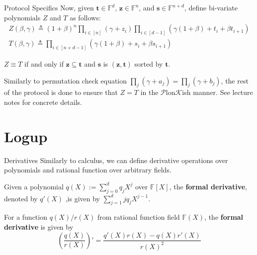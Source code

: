 \documentclass{zkdl-presentation-template}
\begin{document}
    \begin{frame}{Protocol Specifics}
        Now, given $\boldsymbol{t} \in \mathbb{F}^d$, $\boldsymbol{z} \in \mathbb{F}^n$,
        and $\boldsymbol{s} \in \mathbb{F}^{n+d}$, define bi-variate polynomials $Z$ and
        $T$ as follows:
        \begin{gather*}
            Z(\beta,\gamma) \triangleq (1+\beta)^n \prod_{i \in [n]}(\gamma+z_i)\prod_{i \in [d-1]}(\gamma(1+\beta)+t_i+\beta t_{i+1}) \\
            T(\beta,\gamma) \triangleq \prod_{i \in [n+d-1]} (\gamma(1+\beta)+s_i+\beta s_{i+1})
        \end{gather*}

        \pause\begin{theorem}
            $Z \equiv T$ if and only if $\boldsymbol{z} \subseteq \boldsymbol{t}$ and
            $\boldsymbol{s}$ is $(\boldsymbol{z},\boldsymbol{t})$ sorted by
            $\boldsymbol{t}$.\pause
        \end{theorem}

        Similarly to permutation check equation
        $\prod_{j}(\gamma+a_j)=\prod_j(\gamma+b_j)$, the rest of the protocol is
        done to ensure that $Z=T$ in the $\mathcal{P}$lon$\mathcal{K}$ish manner. See lecture notes for 
        concrete details.
    \end{frame}

    \section{Logup}

    \begin{frame}{Derivatives}
        Similarly to calculus, we can define derivative operations over polynomials 
        and rational function over arbitrary fields.\pause
        \begin{definition}
            Given a polynomial $q(X) := \sum_{j=0}^d q_jX^j$ over $\mathbb{F}[X]$, the \textbf{formal
            derivative}, denoted by $q'(X)$ ,is given by
            $\sum_{j=1}^{d}jq_jX^{j-1}$.\pause
        \end{definition}
        \begin{definition}
            For a function $q(X)/r(X)$ from rational function field
            $\mathbb{F}(X)$, the \textbf{formal derivative} is given by
            \begin{equation*}
                \left(\frac{q(X)}{r(X)}\right)' = \frac{q'(X)r(X) - q(X)r'(X)}{r(X)^2}
            \end{equation*}
        \end{definition}
    \end{frame}
\end{document}
